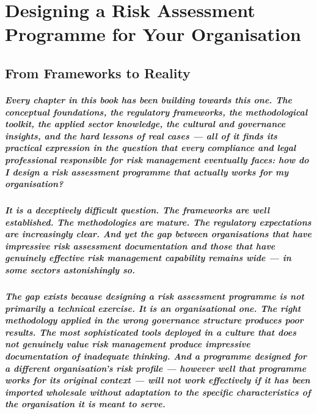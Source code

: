\chapter{Designing a Risk Assessment Programme for Your Organisation}
\label{chap:Designing a Risk Assessment Programme for Your Organisation}

\section{From Frameworks to Reality}
\paragraph{Every chapter in this book has been building towards this one. The conceptual foundations, the regulatory frameworks, the methodological toolkit, the applied sector knowledge, the cultural and governance insights, and the hard lessons of real cases — all of it finds its practical expression in the question that every compliance and legal professional responsible for risk management eventually faces: how do I design a risk assessment programme that actually works for my organisation?}
\paragraph{It is a deceptively difficult question. The frameworks are well established. The methodologies are mature. The regulatory expectations are increasingly clear. And yet the gap between organisations that have impressive risk assessment documentation and those that have genuinely effective risk management capability remains wide — in some sectors astonishingly so.}
\paragraph{The gap exists because designing a risk assessment programme is not primarily a technical exercise. It is an organisational one. The right methodology applied in the wrong governance structure produces poor results. The most sophisticated tools deployed in a culture that does not genuinely value risk management produce impressive documentation of inadequate thinking. And a programme designed for a different organisation's risk profile — however well that programme works for its original context — will not work effectively if it has been imported wholesale without adaptation to the specific characteristics of the organisation it is meant to serve.}
